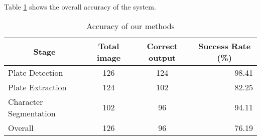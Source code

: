 Table \ref{tab:Accuracy1} shows the overall accuracy of the system.

\begin{table}[htb]
\centering
\caption{Accuracy of our methods}
\label{tab:Accuracy1}
\begin{tabular}{|l|c|c|r|}
    \hline 
    \multicolumn{1}{|c|}{Stage} & 
    \multicolumn{1}{|c|}{Total image} &
    \multicolumn{1}{|c|}{Correct output} &
    \multicolumn{1}{|c|}{Success Rate (\%)} \\
    \hline 
    Plate Detection & 126 & 124 & 98.41 \\ 
    Plate Extraction & 124 & 102 & 82.25 \\ 
    Character Segmentation & 102 & 96 & 94.11 \\
    \hline
    Overall & 126 & 96 & 76.19 \\
    \hline
\end{tabular}
\end{table}

